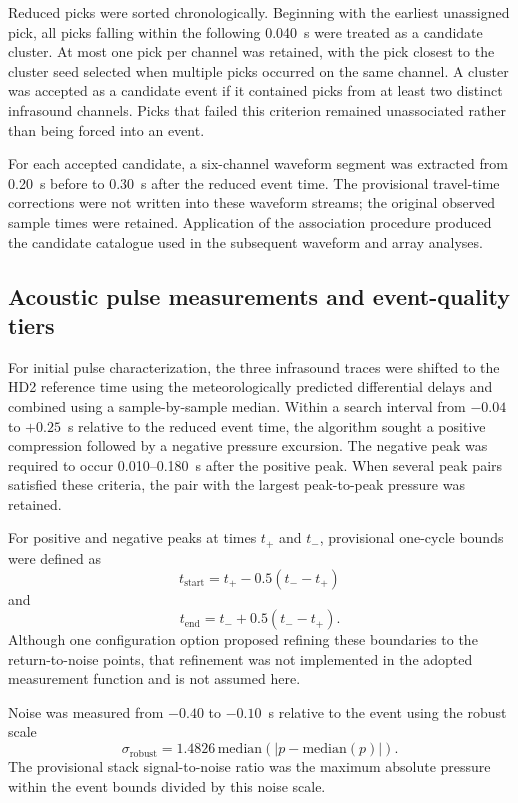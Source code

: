 \documentclass[]{seismica}
\begin{document}
Reduced picks were sorted chronologically. Beginning with the earliest unassigned pick, all picks falling within the following 0.040~s were treated as a candidate cluster. At most one pick per channel was retained, with the pick closest to the cluster seed selected when multiple picks occurred on the same channel. A cluster was accepted as a candidate event if it contained picks from at least two distinct infrasound channels. Picks that failed this criterion remained unassociated rather than being forced into an event.

For each accepted candidate, a six-channel waveform segment was extracted from 0.20~s before to 0.30~s after the reduced event time. The provisional travel-time corrections were not written into these waveform streams; the original observed sample times were retained. Application of the association procedure produced the candidate catalogue used in the subsequent waveform and array analyses.

\subsection{Acoustic pulse measurements and event-quality tiers}

For initial pulse characterization, the three infrasound traces were shifted to the HD2 reference time using the meteorologically predicted differential delays and combined using a sample-by-sample median. Within a search interval from $-0.04$ to $+0.25$~s relative to the reduced event time, the algorithm sought a positive compression followed by a negative pressure excursion. The negative peak was required to occur 0.010--0.180~s after the positive peak. When several peak pairs satisfied these criteria, the pair with the largest peak-to-peak pressure was retained.

For positive and negative peaks at times $t_+$ and $t_-$, provisional one-cycle bounds were defined as
\begin{equation}
  t_{\mathrm{start}} = t_+ - 0.5(t_- - t_+)
  \label{eq:pulse_start}
\end{equation}
and
\begin{equation}
  t_{\mathrm{end}} = t_- + 0.5(t_- - t_+).
  \label{eq:pulse_end}
\end{equation}
Although one configuration option proposed refining these boundaries to the return-to-noise points, that refinement was not implemented in the adopted measurement function and is not assumed here.

Noise was measured from $-0.40$ to $-0.10$~s relative to the event using the robust scale
\begin{equation}
  \sigma_{\mathrm{robust}} = 1.4826\,\mathrm{median}\left(\left|p-\mathrm{median}(p)\right|\right).
  \label{eq:robust_noise}
\end{equation}
The provisional stack signal-to-noise ratio was the maximum absolute pressure within the event bounds divided by this noise scale.
\end{document}
